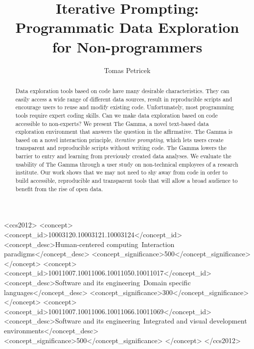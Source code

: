 \documentclass[manuscript,review,anonymous]{acmart}
\begin{document}
\title{Iterative Prompting: Programmatic Data Exploration for Non-programmers}

\author{Tomas Petricek}

\begin{abstract}
  Data exploration tools based on code have many desirable characteristics. They can easily access
  a wide range of different data sources, result in reproducible scripts and encourage users to
  reuse and modify existing code. Unfortunately, most programming tools require expert
  coding skills. Can we make data exploration based on code accessible to non-experts?
  We present The Gamma, a novel text-based data exploration environment that answers the question in
  the affirmative. The Gamma is based on a novel interaction principle, \emph{iterative prompting},
  which lets users create transparent and reproducible scripts without writing code. The Gamma lowers
  the barrier to entry and learning from previously created data analyses. We evaluate the usability
  of The Gamma through a user study on non-technical employees of a research institute.
  Our work shows that we may not need to shy away from code in order to build accessible,
  reproducible and transparent tools that will allow a broad audience to benefit from the
  rise of open data.
\end{abstract}

\begin{CCSXML}
<ccs2012>
   <concept>
       <concept_id>10003120.10003121.10003124</concept_id>
       <concept_desc>Human-centered computing~Interaction paradigms</concept_desc>
       <concept_significance>500</concept_significance>
       </concept>
   <concept>
       <concept_id>10011007.10011006.10011050.10011017</concept_id>
       <concept_desc>Software and its engineering~Domain specific languages</concept_desc>
       <concept_significance>300</concept_significance>
       </concept>
   <concept>
       <concept_id>10011007.10011006.10011066.10011069</concept_id>
       <concept_desc>Software and its engineering~Integrated and visual development environments</concept_desc>
       <concept_significance>500</concept_significance>
       </concept>
 </ccs2012>
\end{CCSXML}

\end{document}

